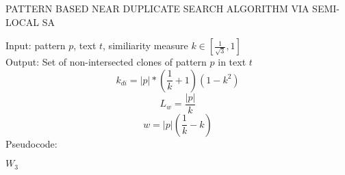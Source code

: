 \begin{algorithm}[!t]
\caption{PATTERN BASED NEAR DUPLICATE
SEARCH ALGORITHM VIA SEMI-LOCAL SA}
\label{alg:patternMathing1}
Input: pattern $p$, text $t$, similiarity measure $k \in  [ \frac{1}{\sqrt{3}} ,1  ]$\\
Output: Set of non-intersected clones of pattern $p$ in text $t$
\begin{equation}
    k_{di}=|p|*(\frac{1}{k}+1)(1-k^2)
\end{equation}
\begin{equation}
 L_{w} = \frac{|p|} {k}
\end{equation}
\begin{equation}
  w = |p|(\frac{1}{k} - k)
\end{equation}
Pseudocode:
\begin{algorithmic}[1]
\ENDIF
\ENDFOR
\RETURN $W_3$
\end{algorithmic}
\end{algorithm}

